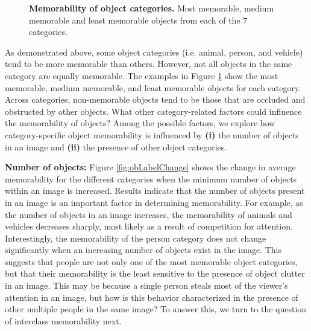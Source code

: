 
\begin{figure}[!htb]
\centering
{}
\vspace{-24pt}\caption{\footnotesize\textbf{Memorability of object categories.} Most memorable, medium memorable and least memorable objects from each of the $7$ categories.}\label{fig:obLabelQual}%
\end{figure}

As demonstrated above, some object categories (i.e. animal, person, and vehicle) tend to be more memorable than others. However, not all objects in the same category are equally memorable. The examples in Figure \ref{fig:obLabelQual} show the most memorable, medium memorable, and least memorable objects for each category. Across categories, non-memorable objects tend to be those that are occluded and obstructed by other objects. What other category-related factors could influence the memorability of objects? Among the possible factors, we explore how category-specific object memorability is influenced by \textbf{(i)} the number of objects in an image and \textbf{(ii)} the presence of other object categories.


\vspace{3pt}\noindent\textbf{Number of objects:} %
Figure \ref{fig:obLabelChange} shows the change in average memorability for the different categories when the minimum number of objects within an image is increased. Results indicate that the number of objects present in an image is an important factor in determining memorability. For example, as the number of objects in an image increases, the memorability of animals and vehicles decreases sharply, most likely as a result of competition for attention. Interestingly, the memorability of the person category does not change significantly when an increasing number of objects exist in the image. This suggests that people are not only one of the most memorable object categories, but that their memorability is the least sensitive to the presence of object clutter in an image. This may be because a single person steals most of the viewer's attention in an image, but how is this behavior characterized in the presence of other multiple people in the same image? To answer this, we turn to the question of interclass memorability next.

